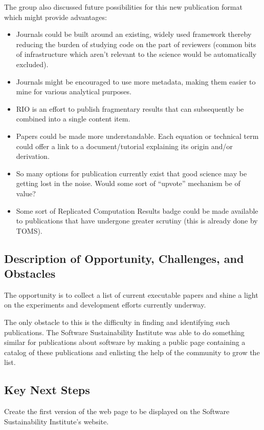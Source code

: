The group also discussed future possibilities for this new publication format which might
provide advantages:
\begin{itemize}
\item Journals could be built around an existing, widely used framework thereby reducing
  the burden of studying code on the part of reviewers (common bits of infrastructure
  which aren't relevant to the science would be automatically excluded).
\item Journals might be encouraged to use more metadata, making them easier to mine
  for various analytical purposes.
\item RIO is an effort to publish fragmentary results that can subsequently be combined
  into a single content item.
\item Papers could be made more understandable. Each equation or technical term could
  offer a link to a document/tutorial explaining its origin and/or derivation.
\item So many options for publication currently exist that good science may be getting
  lost in the noise. Would some sort of ``upvote'' mechanism be of value?
\item Some sort of Replicated Computation Results badge could be made available to
  publications that have undergone greater scrutiny (this is already done by TOMS).
\end{itemize}

\subsection{Description of Opportunity, Challenges, and Obstacles}

The opportunity is to collect a list of current executable papers and
shine a light on the experiments and development efforts currently underway.

The only obstacle to this is the difficulty in finding and identifying such
publications. The Software Sustainability Institute was able to do something similar
for publications about software by making a public page containing a catalog
of these publications and enlisting the help of the community to grow the list.

\subsection{Key Next Steps}

Create the first version of the web page to be displayed on the Software Sustainability
Institute's website.

